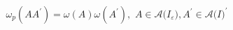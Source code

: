 \begin{equation}
\omega_{p}(AA^{\prime})=\omega(A)\omega(A^{\prime}),\,\,A\in\mathcal{A(}%
I_{\varepsilon}\mathcal{)},A^{\prime}\in\mathcal{A(}I\mathcal{)}^{\prime}%
\end{equation}

